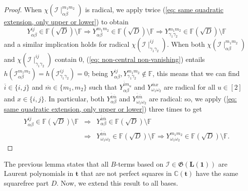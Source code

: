 \documentclass[10pt]{article}
\theoremstyle{remark}%
\theoremstyle{definition}%
\begin{document}
\begin{proof}
When $\chi(\mathcal{I}\mid_{\alpha\beta}^{m_{1}m_{2}})$ is radical, we apply twice (\ref{eq: same quadratic extension, only upper or lower}) to obtain 
\begin{equation} 
Y_{\alpha\beta}^{ij}\in\mathbb{F}(\sqrt{D})\setminus \mathbb{F} \Rightarrow Y_{\alpha\beta}^{m_{1}m_{2}}\in\mathbb{F}(\sqrt{D})\setminus\mathbb{F} \Rightarrow Y_{\gamma_{1}\gamma_{2}}^{m_{1}m_{2}}\in\mathbb{F}(\sqrt{D})\setminus\mathbb{F}
\end{equation} 
and a similar implication holds for radical $\chi(\mathcal{I}\mid_{\gamma_{1}\gamma_{2}}^{ij})$. When both $\chi(\mathcal{I}\mid_{\alpha\beta}^{m_{1}m_{2}})$ and $\chi(\mathcal{I}\mid_{\gamma_{1}\gamma_{2}}^{ij})$ contain $0$, (\ref{eq: non-central non-vanishing}) entails $h(\mathcal{I}_{\alpha\beta}^{m_{1}m_{2}})=h(\mathcal{I}_{\gamma_{1}\gamma_{2}}^{ij})=0$; being $Y_{\alpha\beta}^{ij},Y_{\gamma_{1}\gamma_{2}}^{m_{1}m_{2}}\notin\mathbb{F}$, this means that we can find $\overline{i}\in\{i,j\}$ and $\overline{m}\in\{m_{1},m_{2}\}$ such that $Y_{\alpha\beta}^{\overline{i}m_{u}}$ and $Y_{\omega_{1}\omega_{2}}^{\overline{m}x}$ are radical for all $u\in[2]$ and $x\in\{i,j\}$. In particular, both $Y_{\alpha\beta}^{\overline{i}\overline{m}}$ and $Y_{\omega_{1}\omega_{2}}^{\overline{i}\overline{m}}$ are radical: so, we apply (\ref{eq: same quadratic extension, only upper or lower}) three times to get 
\begin{eqnarray}
    Y_{\alpha\beta}^{ij}\in\mathbb{F}(\sqrt{D})\setminus \mathbb{F} & \Rightarrow & 
    Y_{\alpha\beta}^{\overline{i}\overline{m}}\in\mathbb{F}(\sqrt{D})\setminus\mathbb{F} \nonumber \\ 
    & \Rightarrow &  Y_{\omega_{1}\omega_{2}}^{\overline{i}\overline{m}}\in\mathbb{F}(\sqrt{D})\setminus\mathbb{F} \Rightarrow Y_{\omega_{1}\omega_{2}}^{m_{1}m_{2}}\in\mathbb{F}(\sqrt{D})\setminus\mathbb{F}.
\end{eqnarray}
\end{proof}
The previous lemma states that all $B$-terms based on $\mathcal{I}\in\mathfrak{G}(\mathbf{L}(\mathbf{1}))$ are Laurent polynomials in $\mathbf{t}$ that are not perfect squares in $\mathbb{C}(\mathbf{t})$ have the same squarefree part $D$. Now, we extend this result to all bases. 
\end{document}
